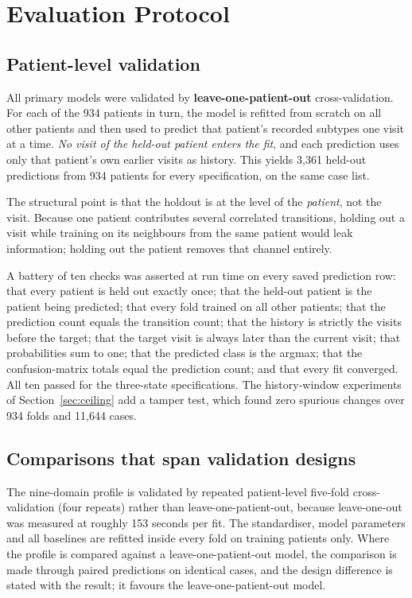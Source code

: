 \documentclass[11pt]{article}
\begin{document}
\section{Evaluation Protocol}
\label{sec:evaluation}

\subsection{Patient-level validation}
All primary models were validated by \textbf{leave-one-patient-out}
cross-validation. For each of the 934 patients in turn, the model is refitted
from scratch on all other patients and then used to predict that patient's
recorded subtypes one visit at a time. \emph{No visit of the held-out patient
enters the fit}, and each prediction uses only that patient's own earlier visits
as history. This yields 3,361 held-out predictions from 934 patients for every
specification, on the same case list.

The structural point is that the holdout is at the level of the \emph{patient},
not the visit. Because one patient contributes several correlated transitions,
holding out a visit while training on its neighbours from the same patient would
leak information; holding out the patient removes that channel entirely.

A battery of ten checks was asserted at run time on every saved prediction row:
that every patient is held out exactly once; that the held-out patient is the
patient being predicted; that every fold trained on all other patients; that the
prediction count equals the transition count; that the history is strictly the
visits before the target; that the target visit is always later than the current
visit; that probabilities sum to one; that the predicted class is the argmax;
that the confusion-matrix totals equal the prediction count; and that every fit
converged. All ten passed for the three-state specifications. The history-window
experiments of Section~\ref{sec:ceiling} add a tamper test, which found zero
spurious changes over 934 folds and 11,644 cases.

\subsection{Comparisons that span validation designs}
The nine-domain profile is validated by repeated patient-level five-fold
cross-validation (four repeats) rather than leave-one-patient-out, because
leave-one-out was measured at roughly 153 seconds per fit. The standardiser,
model parameters and all baselines are refitted inside every fold on training
patients only. Where the profile is compared against a leave-one-patient-out
model, the comparison is made through paired predictions on identical cases, and
the design difference is stated with the result; it favours the
leave-one-patient-out model.
\end{document}
